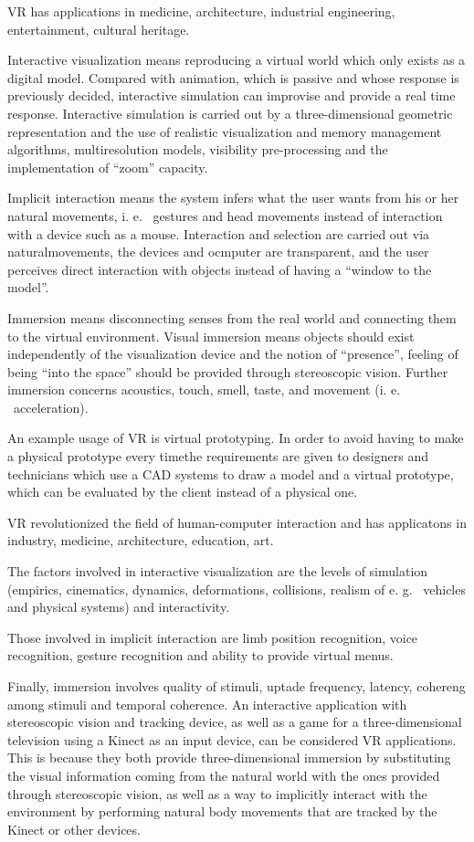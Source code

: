 \documentclass[a4paper]{article}
\begin{document}
VR has applications in medicine, architecture, industrial engineering,
entertainment, cultural heritage.

Interactive visualization means reproducing a virtual world which only
exists as a digital model.
Compared with animation, which is passive and
whose response is previously decided, interactive simulation can
improvise and provide a real time response.
Interactive simulation is
carried out by a three-dimensional geometric representation and the use
of realistic visualization and memory management algorithms,
multiresolution models, visibility pre-processing and the implementation
of ``zoom'' capacity.

Implicit interaction means the system infers what the user wants from
his or her natural movements, i.
e.
~gestures and head movements instead
of interaction with a device such as a mouse.
Interaction and selection
are carried out via naturalmovements, the devices and ocmputer are
transparent, and the user perceives direct interaction with objects
instead of having a ``window to the model''.

Immersion means disconnecting senses from the real world and connecting
them to the virtual environment.
Visual immersion means objects should
exist independently of the visualization device and the notion of
``presence'', feeling of being ``into the space'' should be provided
through stereoscopic vision.
Further immersion concerns acoustics,
touch, smell, taste, and movement (i.
e.
~acceleration).

An example usage of VR is virtual prototyping.
In order to avoid having
to make a physical prototype every timethe requirements are given to
designers and technicians which use a CAD systems to draw a model and a
virtual prototype, which can be evaluated by the client instead of a
physical one.

VR revolutionized the field of human-computer interaction and has
applicatons in industry, medicine, architecture, education, art.

The factors involved in interactive visualization are the levels of
simulation (empirics, cinematics, dynamics, deformations, collisions,
realism of e.
g.
~vehicles and physical systems) and interactivity.

Those involved in implicit interaction are limb position recognition,
voice recognition, gesture recognition and ability to provide virtual
menus.

Finally, immersion involves quality of stimuli, uptade frequency,
latency, cohereng among stimuli and temporal coherence.
An interactive
application with stereoscopic vision and tracking device, as well as a
game for a three-dimensional television using a Kinect as an input
device, can be considered VR applications.
This is because they both
provide three-dimensional immersion by substituting the visual
information coming from the natural world with the ones provided through
stereoscopic vision, as well as a way to implicitly interact with the
environment by performing natural body movements that are tracked by the
Kinect or other devices.
\end{document}
